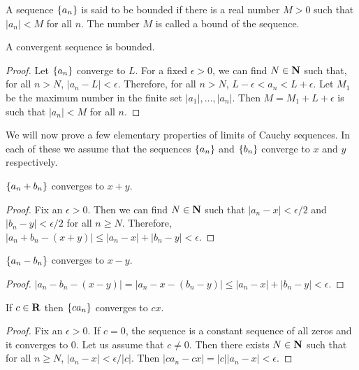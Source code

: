 \begin{defn}\label{c5s1d5}
A sequence $\{a_n\}$ is said to be bounded if there is a real number $M>0$
such that $|a_n| < M$ for all $n$. The number $M$ is called a bound of the
sequence.
\end{defn}

\begin{prop}\label{c5s1p6}
A convergent sequence is bounded.
\end{prop}
\begin{proof}
Let $\{a_n\}$ converge to $L$. For a fixed $\epsilon > 0$, we can find
$N \in \mathbf{N}$ such that, for all $n > N$, $|a_n - L| < \epsilon$. Therefore,
for all $n > N$, $L - \epsilon < a_n < L + \epsilon$. Let $M_1$ be the 
maximum number in the finite set $|a_1|, \ldots, |a_n|$. Then $M = M_1 + 
L + \epsilon$ is such that $|a_n| < M$ for all $n$.
\end{proof}

We will now prove a few elementary properties of limits of Cauchy sequences.
In each of these we assume that the sequences $\{a_n\}$ and $\{b_n\}$
converge to $x$ and $y$ respectively.
\begin{lem}\label{c5s1l1}
$\{a_n + b_n\}$ converges to $x + y$.
\end{lem}
\begin{proof}
Fix an $\epsilon > 0$. Then we can find $N \in \mathbf{N}$ such that $|a_n - x| <
\epsilon/2$ and $|b_n - y| < \epsilon/2$ for all $n \ge N$. Therefore,
$|a_n + b_n - (x + y)| \le |a_n - x| + |b_n - y| < \epsilon$.
\end{proof}

\begin{lem}\label{c5s1l2}
$\{a_n - b_n\}$ converges to $x - y$.
\end{lem}
\begin{proof}
$|a_n - b_n - (x - y)| = |a_n - x - (b_n - y)| \le |a_n - x| + |b_n - y| 
< \epsilon$.
\end{proof}

\begin{lem}\label{c5s1l3}
If $c \in \mathbf{R}$ then $\{ca_n\}$ converges to $cx$.
\end{lem}
\begin{proof}
Fix an $\epsilon > 0$. If $c = 0$, the sequence is a constant sequence of all
zeros and it converges to $0$. Let us assume that $c \ne 0$. Then there 
exists $N \in \mathbf{N}$ such that for all $n \ge N$, $|a_n - x| < \epsilon/|c|$. 
Then $|ca_n - cx| = |c||a_n - x| < \epsilon$.
\end{proof}

